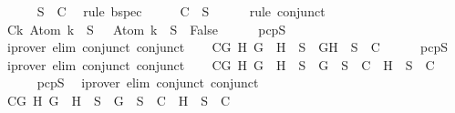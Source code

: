 \begin{isabellebody}
\ \ \ \ \isamarkupfalse%
\ {\isacartoucheopen}S\ {\isasymin}\ C{\isacartoucheclose}\ \isamarkupfalse%
\ {\isacharparenleft}rule\ bspec{\isacharparenright}\isanewline
\ \ \isamarkupfalse%
\ \isamarkupfalse%
\ C{}{\isacharcolon}{\isachardoublequoteopen}{\isasymbottom}\ {\isasymnotin}\ S{\isachardoublequoteclose}\isanewline
\ \ \ \ \isamarkupfalse%
\ {\isacharparenleft}rule\ conjunct{}{\isacharparenright}\isanewline
\ \ \isamarkupfalse%
\ C{}{\isacharcolon}{\isachardoublequoteopen}{\isasymforall}k{\isachardot}\ Atom\ k\ {\isasymin}\ S\ {\isasymlongrightarrow}\ \isactrlbold {\isasymnot}\ {\isacharparenleft}Atom\ k{\isacharparenright}\ {\isasymin}\ S\ {\isasymlongrightarrow}\ False{\isachardoublequoteclose}\isanewline
\ \ \ \ \isamarkupfalse%
\ pcpS\ \isamarkupfalse%
\ {\isacharparenleft}iprover\ elim{\isacharcolon}\ conjunct{}\ conjunct{}{\isacharparenright}\isanewline
\ \ \isamarkupfalse%
\ C{}{\isacharcolon}{\isachardoublequoteopen}{\isasymforall}G\ H{\isachardot}\ G\ \isactrlbold {\isasymand}\ H\ {\isasymin}\ S\ {\isasymlongrightarrow}\ {\isacharbraceleft}G{\isacharcomma}H{\isacharbraceright}\ {\isasymunion}\ S\ {\isasymin}\ C{\isachardoublequoteclose}\isanewline
\ \ \ \ \isamarkupfalse%
\ pcpS\ \isamarkupfalse%
\ {\isacharparenleft}iprover\ elim{\isacharcolon}\ conjunct{}\ conjunct{}{\isacharparenright}\isanewline
\ \ \isamarkupfalse%
\ C{}{\isacharcolon}{\isachardoublequoteopen}{\isasymforall}G\ H{\isachardot}\ G\ \isactrlbold {\isasymor}\ H\ {\isasymin}\ S\ {\isasymlongrightarrow}\ {\isacharbraceleft}G{\isacharbraceright}\ {\isasymunion}\ S\ {\isasymin}\ C\ {\isasymor}\ {\isacharbraceleft}H{\isacharbraceright}\ {\isasymunion}\ S\ {\isasymin}\ C{\isachardoublequoteclose}\isanewline
\ \ \ \ \isamarkupfalse%
\ pcpS\ \isamarkupfalse%
\ {\isacharparenleft}iprover\ elim{\isacharcolon}\ conjunct{}\ conjunct{}{\isacharparenright}\isanewline
\ \ \isamarkupfalse%
\ C{}{\isacharcolon}{\isachardoublequoteopen}{\isasymforall}G\ H{\isachardot}\ G\ \isactrlbold {\isasymrightarrow}\ H\ {\isasymin}\ S\ {\isasymlongrightarrow}\ {\isacharbraceleft}\isactrlbold {\isasymnot}G{\isacharbraceright}\ {\isasymunion}\ S\ {\isasymin}\ C\ {\isasymor}\ {\isacharbraceleft}H{\isacharbraceright}\ {\isasymunion}\ S\ {\isasymin}\ C{\isachardoublequoteclose}\isanewline

\end{isabellebody}
